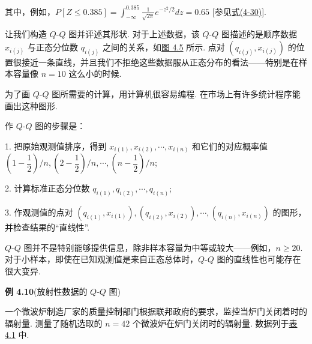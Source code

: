 其中，例如，$P[Z\leqslant0.385]=\int_{-\infty}^{0.385}\frac{1}{\sqrt{2\pi}}e^{-z^{2}/2}dz=0.65$ [参见\hyperref[eq:4-30]{式(4-30)}].

让我们构造 $Q$-$Q$ 图并评述其形状. 对于上述数据，该 $Q$-$Q$ 图描述的是顺序数据 $x_{i(j)}$ 与正态分位数 $q_{i(j)}$ 之间的关系，如\hyperref[fig:4.5]{图 4.5} 所示. 点对 $(q_{i(j)},x_{i(j)})$ 的位置很接近一条直线，并且我们不拒绝这些数据服从正态分布的看法——特别是在样本容量像 $n=10$ 这么小的时候.

\begin{mvfigure}
\label{fig:4.5}
\end{mvfigure}

为了画 $Q$-$Q$ 图所需要的计算，用计算机很容易编程. 在市场上有许多统计程序能画出这种图形.

作 $Q$-$Q$ 图的步骤是：

1. 把原始观测值排序，得到 $x_{i(1)},x_{i(2)},\cdots,x_{i(n)}$ 和它们的对应概率值 $\left(1-\dfrac{1}{2}\right)\big/n,\left(2-\dfrac{1}{2}\right)\big/n,\cdots,\left(n-\dfrac{1}{2}\right)\big/n$;

2. 计算标准正态分位数 $q_{i(1)},q_{i(2)},\cdots,q_{i(n)}$;

3. 作观测值的点对 $(q_{i(1)},x_{i(1)}),(q_{i(2)},x_{i(2)}),\cdots,(q_{i(n)},x_{i(n)})$ 的图形，并检查结果的“直线性”.

$Q$-$Q$ 图并不是特别能够提供信息，除非样本容量为中等或较大——例如，$n\geqslant20$. 对于小样本，即使在已知观测值是来自正态总体时，$Q$-$Q$ 图的直线性也可能存在很大变异.

\noindent\textbf{例 4.10}\quad (放射性数据的 $Q$-$Q$ 图)

一个微波炉制造厂家的质量控制部门根据联邦政府的要求，监控当炉门关闭着时的辐射量. 测量了随机选取的 $n=42$ 个微波炉在炉门关闭时的辐射量. 数据列于\hyperref[tab:4.1]{表 4.1} 中.

